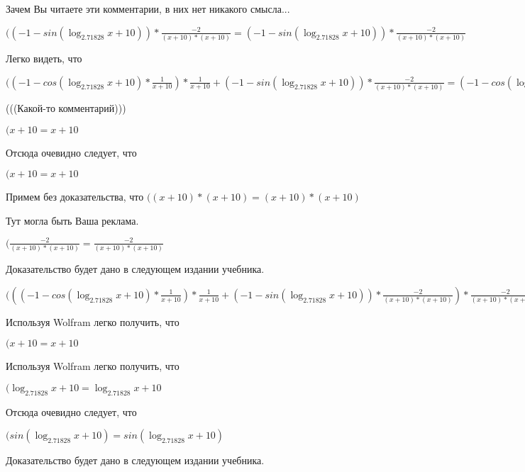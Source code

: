 \documentclass[12pt,a4paper,fleqn]{article}
\theoremstyle{definition}
\begin{document}
Зачем Вы читаете эти комментарии, в них нет никакого смысла...

$(( -1  - sin(\log_{ 2.71828 }{ x  +  10 })) * \frac{ -2 }{( x  +  10 ) * ( x  +  10 )}
 = ( -1  - sin(\log_{ 2.71828 }{ x  +  10 })) * \frac{ -2 }{( x  +  10 ) * ( x  +  10 )}
$

Легко видеть, что

$(( -1  - cos(\log_{ 2.71828 }{ x  +  10 }) * \frac{ 1 }{ x  +  10 }
) * \frac{ 1 }{ x  +  10 }
 + ( -1  - sin(\log_{ 2.71828 }{ x  +  10 })) * \frac{ -2 }{( x  +  10 ) * ( x  +  10 )}
 = ( -1  - cos(\log_{ 2.71828 }{ x  +  10 }) * \frac{ 1 }{ x  +  10 }
) * \frac{ 1 }{ x  +  10 }
 + ( -1  - sin(\log_{ 2.71828 }{ x  +  10 })) * \frac{ -2 }{( x  +  10 ) * ( x  +  10 )}
$

(((Какой-то комментарий)))

$( x  +  10  =  x  +  10 $

Отсюда очевидно следует, что

$( x  +  10  =  x  +  10 $

Примем без доказательства, что
$(( x  +  10 ) * ( x  +  10 ) = ( x  +  10 ) * ( x  +  10 )$

Тут могла быть Ваша реклама.

$(\frac{ -2 }{( x  +  10 ) * ( x  +  10 )}
 = \frac{ -2 }{( x  +  10 ) * ( x  +  10 )}
$

Доказательство будет дано в следующем издании учебника.

$((( -1  - cos(\log_{ 2.71828 }{ x  +  10 }) * \frac{ 1 }{ x  +  10 }
) * \frac{ 1 }{ x  +  10 }
 + ( -1  - sin(\log_{ 2.71828 }{ x  +  10 })) * \frac{ -2 }{( x  +  10 ) * ( x  +  10 )}
) * \frac{ -2 }{( x  +  10 ) * ( x  +  10 )}
 = (( -1  - cos(\log_{ 2.71828 }{ x  +  10 }) * \frac{ 1 }{ x  +  10 }
) * \frac{ 1 }{ x  +  10 }
 + ( -1  - sin(\log_{ 2.71828 }{ x  +  10 })) * \frac{ -2 }{( x  +  10 ) * ( x  +  10 )}
) * \frac{ -2 }{( x  +  10 ) * ( x  +  10 )}
$

Используя Wolfram легко получить, что

$( x  +  10  =  x  +  10 $

Используя Wolfram легко получить, что

$(\log_{ 2.71828 }{ x  +  10 } = \log_{ 2.71828 }{ x  +  10 }$

Отсюда очевидно следует, что

$(sin(\log_{ 2.71828 }{ x  +  10 }) = sin(\log_{ 2.71828 }{ x  +  10 })$

Доказательство будет дано в следующем издании учебника.
\end{document}
